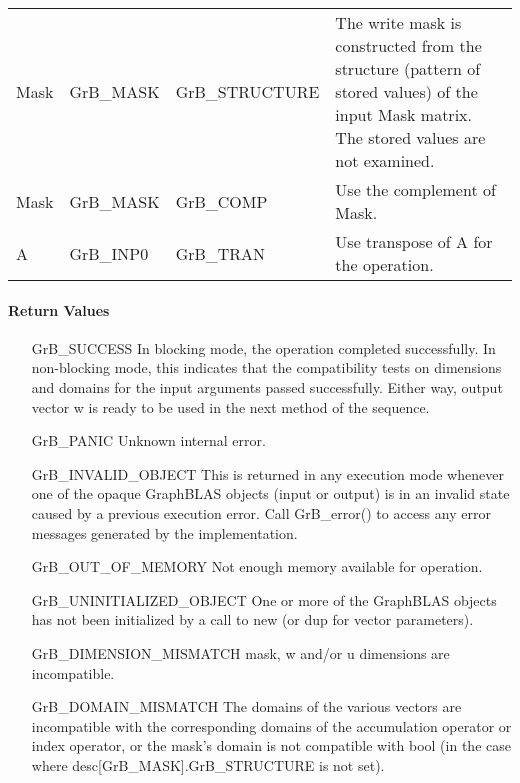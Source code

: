 \begin{itemize}[leftmargin=1.1in]
\begin{tabular}{lllp{2.7in}}
        {\sf Mask} & {\sf GrB\_MASK} & {\sf GrB\_STRUCTURE}   & The write mask is
        constructed from the structure (pattern of stored values) of the input
        {\sf Mask} matrix. The stored values are not examined.\\

        {\sf Mask} & {\sf GrB\_MASK} & {\sf GrB\_COMP}   & Use the 
        complement of {\sf Mask}. \\

        {\sf A}    & {\sf GrB\_INP0} & {\sf GrB\_TRAN}   & Use transpose of {\sf A}
        for the operation. \\
    \end{tabular}
\end{itemize}


\paragraph{Return Values}

\begin{itemize}[leftmargin=2.1in]
    \item[{\sf GrB\_SUCCESS}]         In blocking mode, the operation completed
    successfully. In non-blocking mode, this indicates that the compatibility 
    tests on dimensions and domains for the input arguments passed successfully. 
    Either way, output vector {\sf w} is ready to be used in the next method of 
    the sequence.

    \item[{\sf GrB\_PANIC}]           Unknown internal error.

    \item[{\sf GrB\_INVALID\_OBJECT}] This is returned in any execution mode 
    whenever one of the opaque GraphBLAS objects (input or output) is in an invalid 
    state caused by a previous execution error.  Call {\sf GrB\_error()} to access 
    any error messages generated by the implementation.

    \item[{\sf GrB\_OUT\_OF\_MEMORY}] Not enough memory available for operation.

    \item[{\sf GrB\_UNINITIALIZED\_OBJECT}] One or more of the GraphBLAS objects
    has not been initialized by a call to {\sf new} (or {\sf dup} for vector
    parameters).

    \item[{\sf GrB\_DIMENSION\_MISMATCH}]  {\sf mask}, {\sf w} and/or {\sf u}
    dimensions are incompatible.

    \item[{\sf GrB\_DOMAIN\_MISMATCH}]    The domains of the various vectors are
    incompatible with the corresponding domains of the accumulation operator
    or index operator, or the mask's domain is not compatible with {\sf bool}
    (in the case where {\sf desc[GrB\_MASK].GrB\_STRUCTURE} is not set).
\end{itemize}

